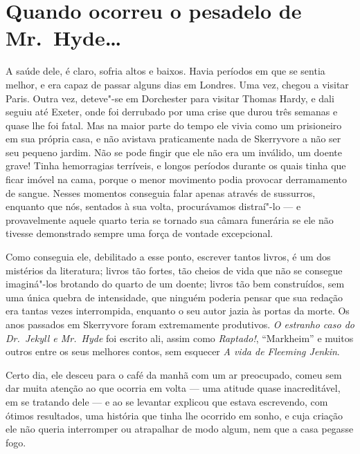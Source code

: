 \chapter[Quando ocorreu o pesadelo de Mr.~Hyde\ldots{}\\ \textit{Lloyd Osbourne}]{Quando ocorreu o pesadelo de Mr.~Hyde\ldots{}}

A saúde dele, é claro, sofria altos e baixos.  Havia períodos em que se
sentia melhor, e era capaz de passar alguns dias em Londres.  Uma vez,
chegou a visitar Paris.  Outra vez, deteve"-se em Dorchester para
visitar Thomas Hardy, e dali seguiu até Exeter, onde foi derrubado por
uma crise que durou três semanas e quase lhe foi fatal.  Mas na maior
parte do tempo ele vivia como um prisioneiro em sua própria casa, e não
avistava praticamente nada de Skerryvore a não ser seu pequeno jardim. 
Não se pode fingir que ele não era um inválido, um doente grave!  Tinha
hemorragias terríveis, e longos períodos durante os quais tinha que
ficar imóvel na cama, porque o menor movimento podia provocar		
derramamento de sangue.  Nesses momentos conseguia falar apenas
através de sussurros, enquanto que nós, sentados à sua volta,
procurávamos distraí"-lo --- e provavelmente aquele quarto teria se
tornado sua câmara funerária se ele não tivesse demonstrado sempre uma
força de vontade excepcional.

Como conseguia ele, debilitado a esse ponto, escrever tantos livros, é
um dos mistérios da literatura; livros tão fortes, tão cheios de vida
que não se consegue imaginá"-los brotando do quarto de um doente; livros
tão bem construídos, sem uma única quebra de intensidade, que ninguém
poderia pensar que sua redação era tantas vezes interrompida, enquanto
o seu autor jazia às portas da morte.  Os anos passados em Skerryvore
foram extremamente produtivos.  \textit{O estranho caso do Dr.~Jekyll e
Mr.~Hyde} foi escrito ali, assim como \textit{Raptado!}, “Markheim” e
muitos outros entre os seus melhores contos, sem esquecer \textit{A
vida de Fleeming Jenkin}. 

Certo dia, ele desceu para o café da manhã com um ar preocupado, comeu
sem dar muita atenção ao que ocorria em volta --- uma atitude quase
inacreditável, em se tratando dele --- e ao se levantar explicou que
estava escrevendo, com ótimos resultados, uma história que tinha lhe
ocorrido em sonho, e cuja criação ele não queria interromper ou
atrapalhar de modo algum, nem que a casa pegasse fogo.

